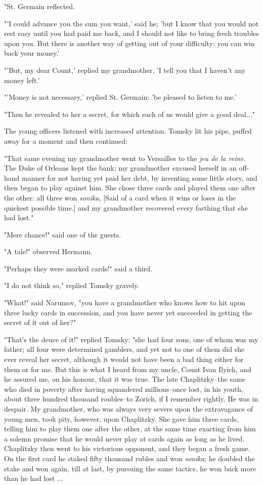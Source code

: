 "St. Germain reflected.

"'I could advance you the sum you want,' said he; 'but I know that you
would not rest easy until you had paid me back, and I should not like
to bring fresh troubles upon you. But there is another way of getting
out of your difficulty: you can win back your money.'

"'But, my dear Count,' replied my grandmother, 'I tell you that I
haven't any money left.'

"'Money is not necessary,' replied St. Germain: 'be pleased to listen
to me.'

"Then he revealed to her a secret, for which each of us would give a
good deal..."

The young officers listened with increased attention. Tomsky lit his
pipe, puffed away for a moment and then continued:

"That same evening my grandmother went to Versailles to the \emph{jeu de la
reine}. The Duke of Orleans kept the bank; my grandmother excused
herself in an off-hand manner for not having yet paid her debt, by
inventing some little story, and then began to play against him. She
chose three cards and played them one after the other: all three won
\emph{sonika}, [Said of a card when it wins or loses in the quickest
possible time.] and my grandmother recovered every farthing that she
had lost."

"Mere chance!" said one of the guests.

"A tale!" observed Hermann.

"Perhaps they were marked cards!" said a third.

"I do not think so," replied Tomsky gravely.

"What!" said Narumov, "you have a grandmother who knows how to hit
upon three lucky cards in succession, and you have never yet succeeded
in getting the secret of it out of her?"

"That's the deuce of it!" replied Tomsky: "she had four sons, one of
whom was my father; all four were determined gamblers, and yet not to
one of them did she ever reveal her secret, although it would not have
been a bad thing either for them or for me. But this is what I heard
from my uncle, Count Ivan Ilyich, and he assured me, on his honour,
that it was true. The late Chaplitzky--the same who died in poverty
after having squandered millions--once lost, in his youth, about three
hundred thousand roubles--to Zorich, if I remember rightly. He was in
despair. My grandmother, who was always very severe upon the
extravagance of young men, took pity, however, upon Chaplitzky. She
gave him three cards, telling him to play them one after the other, at
the same time exacting from him a solemn promise that he would never
play at cards again as long as he lived. Chaplitzky then went to his
victorious opponent, and they began a fresh game. On the first card he
staked fifty thousand rubles and won \emph{sonika}; he doubled the stake
and won again, till at last, by pursuing the same tactics, he won back
more than he had lost ...

